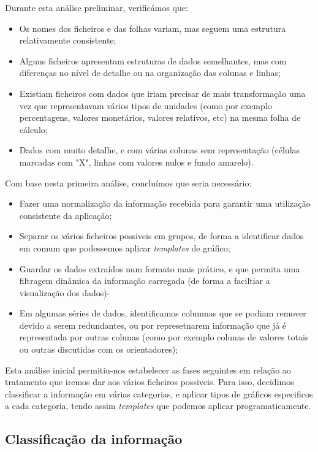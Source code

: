 Durante esta análise preliminar, verificámos que:
\begin{itemize}
    \item Os nomes dos ficheiros e das folhas variam, mas seguem uma estrutura relativamente consistente;
    \item Alguns ficheiros apresentam estruturas de dados semelhantes, mas com diferenças no nível de detalhe ou na organização das colunas e linhas;
    \item Existiam ficheiros com dados que iriam precisar de mais transformação uma vez que representavam vários tipos de unidades (como por exemplo percentagens, valores monetários, valores relativos, etc) na mesma folha de cálculo;
    \item Dados com muito detalhe, e com várias colunas sem representação (células marcadas com "X", linhas com valores nulos e fundo amarelo).
\end{itemize}

Com base nesta primeira análise, concluímos que seria necessário:
\begin{itemize}
    \item Fazer uma normalização da informação recebida para garantir uma utilização consistente da aplicação;
    \item Separar os vários ficheiros possiveis em grupos, de forma a identificar dados em comum que podessemos aplicar \textit{templates} de gráfico;
    \item Guardar os dados extraídos num formato mais prático, e que permita uma filtragem dinâmica da informação carregada (de forma a faciltiar a visualização dos dados)-
    \item Em algumas séries de dados, identificamos columnas que se podiam remover devido a serem redundantes, ou por represetnarem informação que já é representada por outras colunas (como por exemplo colunas de valores totais ou outras discutidas com os orientadores);
\end{itemize}

Esta análise inicial permitiu-nos estabelecer as fases seguintes em relação ao tratamento que iremos dar aos vários ficheiros possiveis. Para isso, decidimos classificar a informação em várias categorias, e aplicar tipos de gráficos especificos a cada categoria, tendo assim \textit{templates} que podemos aplicar programaticamente. 

\subsection{Classificação da informação}

